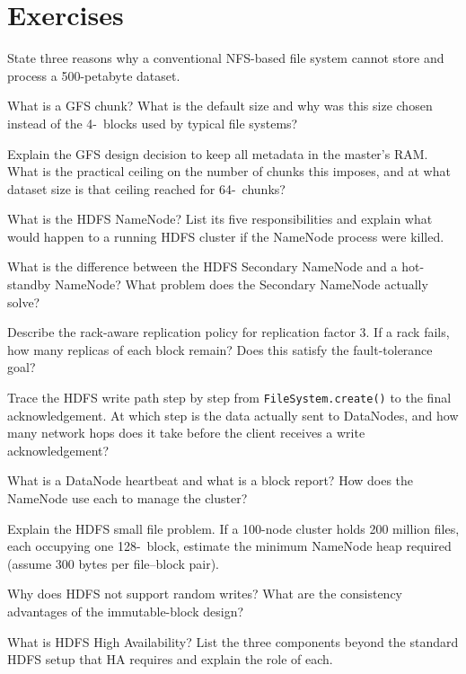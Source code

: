 \section*{Exercises}
\label{sec:ch3-exercises}


\sq State three reasons why a conventional NFS-based file system cannot
store and process a 500-petabyte dataset.

\sq What is a GFS chunk? What is the default size and why was this size
chosen instead of the 4-\KB\ blocks used by typical file systems?

\sq Explain the GFS design decision to keep all metadata in the master's
RAM. What is the practical ceiling on the number of chunks this imposes,
and at what dataset size is that ceiling reached for 64-\MB\ chunks?

\sq What is the HDFS NameNode? List its five responsibilities and
explain what would happen to a running HDFS cluster if the NameNode
process were killed.

\sq What is the difference between the HDFS Secondary NameNode and a
hot-standby NameNode? What problem does the Secondary NameNode actually
solve?

\sq Describe the rack-aware replication policy for replication factor 3.
If a rack fails, how many replicas of each block remain? Does this
satisfy the fault-tolerance goal?

\sq Trace the HDFS write path step by step from \texttt{FileSystem.create()}
to the final acknowledgement. At which step is the data actually sent
to DataNodes, and how many network hops does it take before the client
receives a write acknowledgement?

\sq What is a DataNode heartbeat and what is a block report? How does the
NameNode use each to manage the cluster?

\sq Explain the HDFS small file problem. If a 100-node cluster holds
200 million files, each occupying one 128-\MB\ block, estimate the
minimum NameNode heap required (assume 300 bytes per file--block pair).

\sq Why does HDFS not support random writes? What are the consistency
advantages of the immutable-block design?

\sq What is HDFS High Availability? List the three components beyond the
standard HDFS setup that HA requires and explain the role of each.

